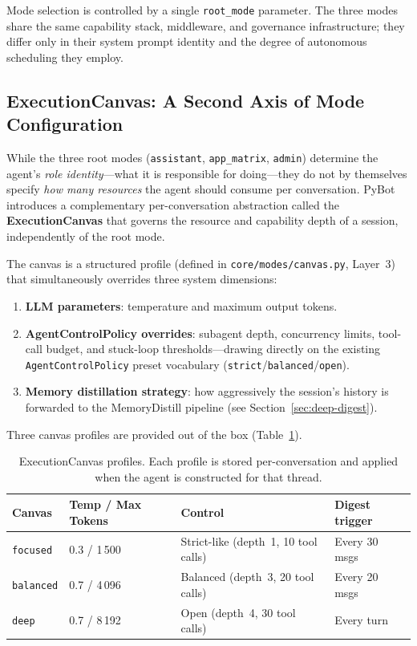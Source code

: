 \documentclass[11pt,a4paper]{article}
\begin{document}
Mode selection is controlled by a single \texttt{root\_mode} parameter.
The three modes share the same capability stack, middleware, and governance infrastructure; they differ only in their system prompt identity and the degree of autonomous scheduling they employ.

\subsection{ExecutionCanvas: A Second Axis of Mode Configuration}
\label{sec:canvas}

While the three root modes (\texttt{assistant}, \texttt{app\_matrix}, \texttt{admin}) determine the agent's \emph{role identity}---what it is responsible for doing---they do not by themselves specify \emph{how many resources} the agent should consume per conversation.
PyBot introduces a complementary per-conversation abstraction called the \textbf{ExecutionCanvas} that governs the resource and capability depth of a session, independently of the root mode.

The canvas is a structured profile (defined in \texttt{core/modes/canvas.py}, Layer~3) that simultaneously overrides three system dimensions:
\begin{enumerate}
  \item \textbf{LLM parameters}: temperature and maximum output tokens.
  \item \textbf{AgentControlPolicy overrides}: subagent depth, concurrency limits, tool-call budget, and stuck-loop thresholds---drawing directly on the existing \texttt{AgentControlPolicy} preset vocabulary (\texttt{strict}/\texttt{balanced}/\texttt{open}).
  \item \textbf{Memory distillation strategy}: how aggressively the session's history is forwarded to the MemoryDistill pipeline (see Section~\ref{sec:deep-digest}).
\end{enumerate}

Three canvas profiles are provided out of the box (Table~\ref{tab:canvas}).

\begin{table}[h]
\centering
\small
\begin{tabularx}{\textwidth}{lXXX}
\toprule
\textbf{Canvas} & \textbf{Temp / Max Tokens} & \textbf{Control} & \textbf{Digest trigger} \\
\midrule
\texttt{focused}  & 0.3 / 1\,500 & Strict-like (depth~1, 10 tool calls) & Every 30 msgs \\
\texttt{balanced} & 0.7 / 4\,096 & Balanced (depth~3, 20 tool calls)    & Every 20 msgs \\
\texttt{deep}     & 0.7 / 8\,192 & Open (depth~4, 30 tool calls)        & Every turn \\
\bottomrule
\end{tabularx}
\caption{ExecutionCanvas profiles. Each profile is stored per-conversation and applied when the agent is constructed for that thread.}
\label{tab:canvas}
\end{table}
\end{document}
